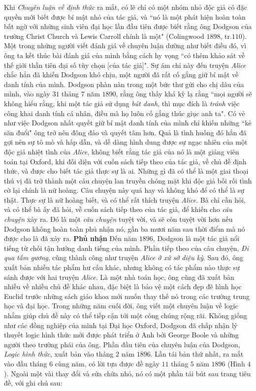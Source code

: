 \begin{multicols}{2}
	Khi \textit{Chuyên luận về định thức} ra mắt, có lẽ chỉ có một nhóm nhỏ độc giả có đặc quyền mới biết được bí mật nhỏ của tác giả, và ``nó là một phát hiện hoàn toàn bất ngờ với những sinh viên đại học lần đầu tiên được biết rằng ông Dodgson của trường Christ Church và Lewis Carroll chính là một" (Colingwood $1898$, tr.$110$). Một trong những người viết đánh giá về chuyên luận dường như biết điều đó, vì ông ta kết thúc bài đánh giá của mình bằng cách hy vọng ``có thêm khảo sát về thế giới thần tiên đại số tùy chọn [của tác giả]". Sự ám chỉ này đến truyện \textit{Alice} chắc hẳn đã khiến Dodgson khó chịu, một người đã rất cố gắng giữ bí mật về danh tính của mình. Dodgson phàn nàn trong một bức thư gửi cho chị dâu của mình, vào ngày $31$ tháng $7$ năm $1890$, rằng ông thấy khá kỳ lạ rằng ``mọi người sẽ không hiểu rằng, khi một tác giả sử dụng \textit{bút danh}, thì mục đích là \textit{tránh} việc công khai danh tính cá nhân, điều mà họ luôn cố gắng thúc giục anh ta". Có vẻ như việc Dodgson nhất quyết giữ bí mật danh tính của mình chỉ khiến những ``kẻ săn đuổi" ông trở nên đông đảo và quyết tâm hơn. Quả là tình huống đó hẳn đã gợi nên sự tò mò và hấp dẫn, và dễ dàng hình dung được sự ngạc nhiên của một độc giả nhiệt tình của \textit{Alice}, không biết rằng tác giả của nó là một giảng viên toán tại Oxford, khi đối diện với cuốn sách tiếp theo của tác giả, về chủ đề định thức, và được cho biết tác giả thực sự là ai. Những gì đã có thể là một giai thoại thú vị đã trở thành một câu chuyện lan truyền chóng mặt khi độc giả bối rối tình cờ lại chính là nữ hoàng.
	\vskip 0.1cm
	Câu chuyện này quá hay và không khó để có thể là sự thật. Thực sự là nữ hoàng biết, và có thể rất thích truyện \textit{Alice}. Bà  chỉ cần hỏi, và có thể bà ấy đã hỏi, về cuốn sách tiếp theo của tác giả, để khiến cho \textit{câu chuyện} xảy ra. Đó là một \textit{câu chuyện} tuyệt vời, và sẽ còn tuyệt vời hơn nếu Dodgson không hoàn toàn phủ nhận nó, gần ba mươi năm sau thời điểm mà nó được cho là đã xảy ra.
	\vskip 0.1cm
	\textbf{\color{quantoan}Phủ nhận} 
	\vskip 0.1cm
	Đến năm $1896$, Dodgson là một tác giả nổi tiếng từ chối tận hưởng danh tiếng của mình. Phần tiếp theo của câu chuyện, \textit{Đi qua tấm gương}, cũng  thành công như truyện \textit{Alice ở xứ sở diệu kỳ}.
	\vskip 0.1cm
	Sau đó, ông xuất bản nhiều tác phẩm hư cấu khác, nhưng không có tác phẩm nào thực sự sánh được với hai truyện \textit{Alice}. Là một nhà toán học, ông cũng đã xuất bản nhiều về nhiều chủ đề khác nhau, đặc biệt là bảo vệ một cách đẹp đẽ hình học Euclid trước những sách giáo khoa mới muốn thay thế nó trong các trường trung học và đại học. Trong những năm cuối đời, ông viết một chuyên luận về logic nhằm giúp chủ đề này có thể tiếp cận tới một công chúng rộng rãi. Không giống như các đồng nghiệp của mình tại Đại học Oxford, Dodgson đã chấp nhận lý thuyết logic hình thức mới được phát triển ở Anh bởi George Boole và những người theo trường phái của ông. Phần đầu tiên của chuyên luận của Dodgson, \textit{Logic hình thức}, xuất bản vào tháng $2$ năm $1896$. Lần tái bản thứ nhất, ra mắt vào đầu tháng $6$ cùng năm, có lời tựa được đề ngày $11$ tháng $5$ năm $1896$ (Hình $4$). Ngoài một vài thay đổi và sửa chữa nhỏ, nó có một phần tái bút sau trang tiêu đề, với ghi chú sau:

\end{multicols}
